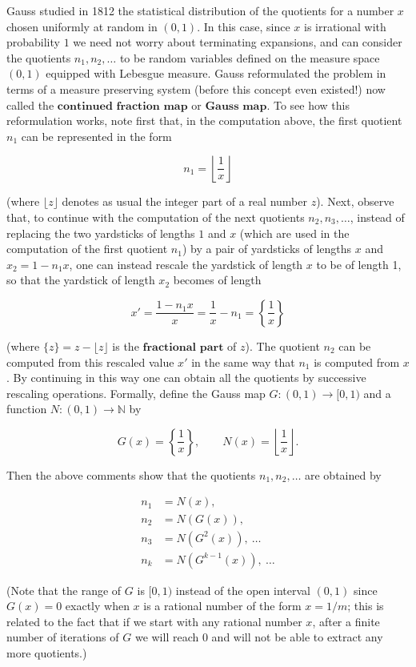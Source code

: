 \documentclass[11pt]{report}
\newcommand{\N}{\mathbb{N}}
\theoremstyle{plain}
\theoremstyle{definition}
\begin{document}
\begin{enumerate}[label=\arabic*.]
\noindent Gauss studied in 1812 the statistical distribution of
the quotients for a number $x$ chosen uniformly at
random in $(0,1)$. In this case, since $x$ is
irrational with probability $1$ we need not worry
about terminating expansions, and can consider the
quotients $n_1, n_2, \ldots$ to be random variables
defined on the measure space $(0,1)$ equipped with
Lebesgue measure. Gauss reformulated the problem in
terms of a measure preserving system (before this
concept even existed!) now called the
$\textbf{continued fraction map}$ or
$\textbf{Gauss map}$. To see how this reformulation
works, note first that, in the computation above, the
first quotient $n_1$ can be represented in the form

\[
n_1 = \left\lfloor \frac{1}{x} \right\rfloor
\]

\noindent (where $\lfloor z \rfloor$ denotes as usual the
integer part of a real number $z$). Next, observe
that, to continue with the computation of the next
quotients $n_2,n_3,\ldots$, instead of replacing the
two yardsticks of lengths $1$ and $x$ (which are used
in the computation of the first quotient $n_1$) by a
pair of yardsticks of lengths $x$ and $x_2=1-n_1 x$,
one can instead rescale the yardstick of length $x$
to be of length 1, so that the yardstick of length
$x_2$ becomes of length

\[
x'=\frac{1-n_1 x}{x} = \frac{1}{x}-n_1 = \left\{ \frac{1}{x} \right\}
\]

\noindent (where $\{z\}=z-\lfloor z\rfloor$ is the
$\textbf{fractional part}$ of $z$). The quotient $n_2$
can be computed from this rescaled value $x'$ in the
same way that $n_1$ is computed from $x$. By
continuing in this way one can obtain all the
quotients by successive rescaling operations.
Formally, define the Gauss map $G:(0,1)\to[0,1)$ and
a function $N:(0,1)\to\N$ by

\[
G(x) = \left\{ \frac{1}{x}\right\}, \qquad
N(x) = \left\lfloor \frac{1}{x}\right\rfloor.
\]

\noindent Then the above comments show that the quotients
$n_1,n_2,\ldots$ are obtained by

\begin{align*}
n_1 &= N(x), \\
n_2 &= N(G(x)), \\
n_3 &= N(G^2(x)), \ \ldots \\
n_k &= N(G^{k-1}(x)), \ \ldots
\end{align*}

\noindent (Note that the range of $G$ is $[0,1)$ instead of the
open interval $(0,1)$ since $G(x)=0$ exactly when $x$
is a rational number of the form $x=1/m$; this is
related to the fact that if we start with any rational
number $x$, after a finite number of iterations of $G$
we will reach $0$ and will not be able to extract any
more quotients.)


\end{enumerate}
\end{document}
